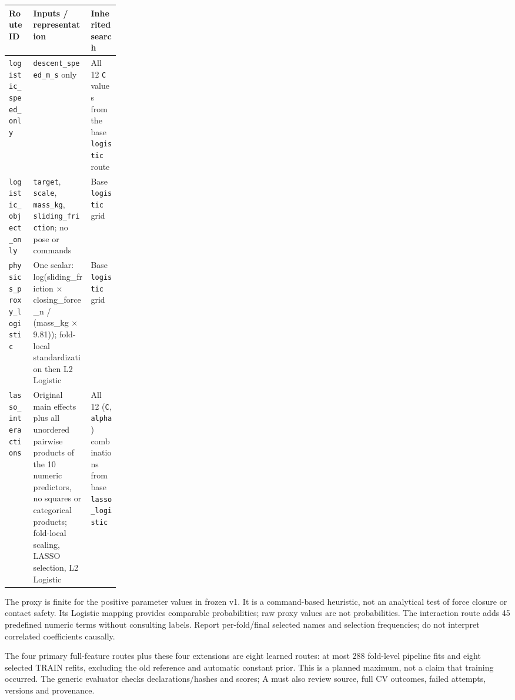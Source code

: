 \documentclass[11pt,letterpaper]{article}
\begin{document}
\begin{center}\small\begin{tabularx}{\linewidth}{@{}p{0.22\linewidth}YY@{}}\toprule

\textbf{Route ID} & \textbf{Inputs / representation} & \textbf{Inherited search}\\\midrule

\texttt{logistic\_\allowbreak{}speed\_\allowbreak{}only} & \texttt{descent\_\allowbreak{}speed\_\allowbreak{}m\_\allowbreak{}s} only & All 12 \texttt{C} values from the base \texttt{logistic} route\\

\texttt{logistic\_\allowbreak{}object\_\allowbreak{}only} & \texttt{target}, \texttt{scale}, \texttt{mass\_\allowbreak{}kg}, \texttt{sliding\_\allowbreak{}friction}; no pose or commands & Base \texttt{logistic} grid\\

\texttt{physics\_\allowbreak{}proxy\_\allowbreak{}logistic} & One scalar: log(sliding\_friction × closing\_force\_n / (mass\_kg × 9.81)); fold-local standardization then L2 Logistic & Base \texttt{logistic} grid\\

\texttt{lasso\_\allowbreak{}interactions} & Original main effects plus all unordered pairwise products of the 10 numeric predictors, no squares or categorical products; fold-local scaling, LASSO selection, L2 Logistic & All 12 (\texttt{C}, \texttt{alpha}) combinations from base \texttt{lasso\_\allowbreak{}logistic}\\

\bottomrule\end{tabularx}\end{center}

The proxy is finite for the positive parameter values in frozen v1. It is a command-based heuristic, not an analytical test of force closure or contact safety. Its Logistic mapping provides comparable probabilities; raw proxy values are not probabilities. The interaction route adds 45 predefined numeric terms without consulting labels. Report per-fold/final selected names and selection frequencies; do not interpret correlated coefficients causally.

The four primary full-feature routes plus these four extensions are eight learned routes: at most 288 fold-level pipeline fits and eight selected TRAIN refits, excluding the old reference and automatic constant prior. This is a planned maximum, not a claim that training occurred. The generic evaluator checks declarations/hashes and scores; A must also review source, full CV outcomes, failed attempts, versions and provenance.
\end{document}
